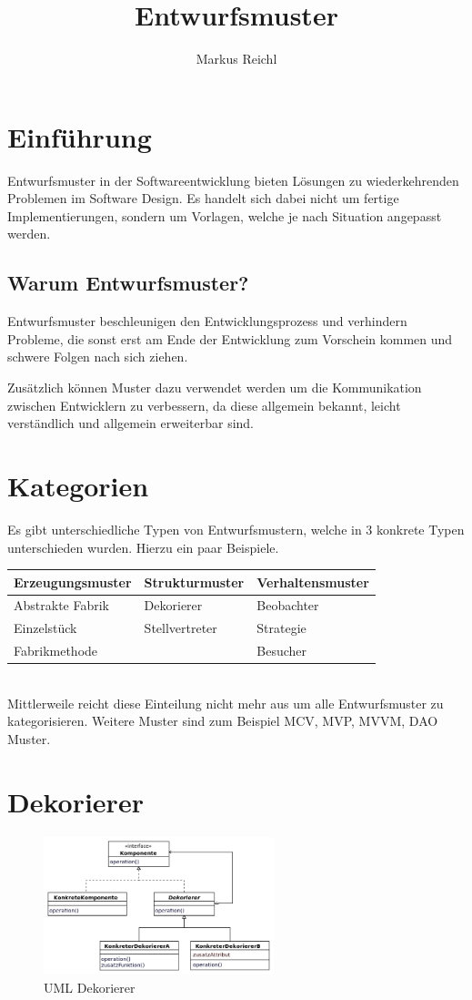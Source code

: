 \documentclass{school}
\title{Entwurfsmuster}
\author{Markus Reichl}
\begin{document}
\maketitle
\thispagestyle{fancy}
\tableofcontents

\section{Einführung}
Entwurfsmuster in der Softwareentwicklung bieten Lösungen zu wiederkehrenden Problemen im Software Design. Es handelt sich dabei nicht um fertige Implementierungen, sondern um Vorlagen, welche je nach Situation angepasst werden.

\subsection{Warum Entwurfsmuster?}
Entwurfsmuster beschleunigen den Entwicklungsprozess und verhindern Probleme, die sonst erst am Ende der Entwicklung zum Vorschein kommen und schwere Folgen nach sich ziehen.

Zusätzlich können Muster dazu verwendet werden um die Kommunikation zwischen Entwicklern zu verbessern, da diese allgemein bekannt, leicht verständlich und allgemein erweiterbar sind.

\section{Kategorien}
Es gibt unterschiedliche Typen von Entwurfsmustern, welche in 3 konkrete Typen unterschieden wurden. Hierzu ein paar Beispiele.

\begin{tabularx}{\textwidth}{X | X | X}
\textbf{Erzeugungsmuster} & \textbf{Strukturmuster} & \textbf{Verhaltensmuster}\\
\hline
Abstrakte Fabrik & Dekorierer & Beobachter\\
Einzelstück & Stellvertreter & Strategie\\
Fabrikmethode & & Besucher
\end{tabularx}
\vspace{0.5em}~\\
Mittlerweile reicht diese Einteilung nicht mehr aus um alle Entwurfsmuster zu kategorisieren. Weitere Muster sind zum Beispiel MCV, MVP, MVVM, DAO Muster.

\newpage
\section{Dekorierer}
\begin{figure}[h]
	\centering
	\includegraphics[height=4cm]{decorator.png}
	\caption{UML Dekorierer \cite{wiki-dekorierer-uml}}
\end{figure}
\end{document}

